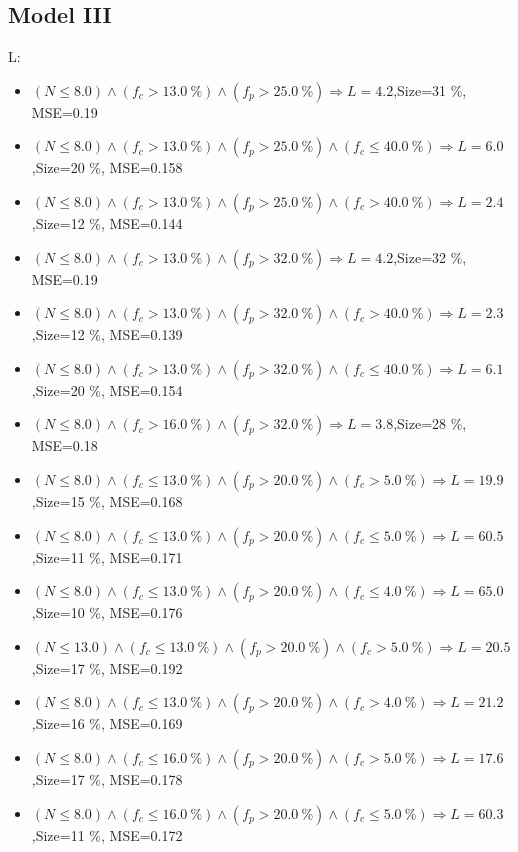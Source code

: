 \documentclass[numbered]{CSL}
\begin{document}
\subsection{Model III}
L:
\begin{itemize}
\item $(N \leq 8.0) \land (f_c > 13.0~\%) \land (f_p > 25.0~\%) \Rightarrow L = 4.2$,\hfill Size=31 \%, MSE=0.19
\item $(N \leq 8.0) \land (f_c > 13.0~\%) \land (f_p > 25.0~\%) \land (f_c \leq 40.0~\%) \Rightarrow L = 6.0$,\hfill Size=20 \%, MSE=0.158
\item $(N \leq 8.0) \land (f_c > 13.0~\%) \land (f_p > 25.0~\%) \land (f_c > 40.0~\%) \Rightarrow L = 2.4$,\hfill Size=12 \%, MSE=0.144
\item $(N \leq 8.0) \land (f_c > 13.0~\%) \land (f_p > 32.0~\%) \Rightarrow L = 4.2$,\hfill Size=32 \%, MSE=0.19
\item $(N \leq 8.0) \land (f_c > 13.0~\%) \land (f_p > 32.0~\%) \land (f_c > 40.0~\%) \Rightarrow L = 2.3$,\hfill Size=12 \%, MSE=0.139
\item $(N \leq 8.0) \land (f_c > 13.0~\%) \land (f_p > 32.0~\%) \land (f_c \leq 40.0~\%) \Rightarrow L = 6.1$,\hfill Size=20 \%, MSE=0.154
\item $(N \leq 8.0) \land (f_c > 16.0~\%) \land (f_p > 32.0~\%) \Rightarrow L = 3.8$,\hfill Size=28 \%, MSE=0.18
\item $(N \leq 8.0) \land (f_c \leq 13.0~\%) \land (f_p > 20.0~\%) \land (f_c > 5.0~\%) \Rightarrow L = 19.9$,\hfill Size=15 \%, MSE=0.168
\item $(N \leq 8.0) \land (f_c \leq 13.0~\%) \land (f_p > 20.0~\%) \land (f_c \leq 5.0~\%) \Rightarrow L = 60.5$,\hfill Size=11 \%, MSE=0.171
\item $(N \leq 8.0) \land (f_c \leq 13.0~\%) \land (f_p > 20.0~\%) \land (f_c \leq 4.0~\%) \Rightarrow L = 65.0$,\hfill Size=10 \%, MSE=0.176
\item $(N \leq 13.0) \land (f_c \leq 13.0~\%) \land (f_p > 20.0~\%) \land (f_c > 5.0~\%) \Rightarrow L = 20.5$,\hfill Size=17 \%, MSE=0.192
\item $(N \leq 8.0) \land (f_c \leq 13.0~\%) \land (f_p > 20.0~\%) \land (f_c > 4.0~\%) \Rightarrow L = 21.2$,\hfill Size=16 \%, MSE=0.169
\item $(N \leq 8.0) \land (f_c \leq 16.0~\%) \land (f_p > 20.0~\%) \land (f_c > 5.0~\%) \Rightarrow L = 17.6$,\hfill Size=17 \%, MSE=0.178
\item $(N \leq 8.0) \land (f_c \leq 16.0~\%) \land (f_p > 20.0~\%) \land (f_c \leq 5.0~\%) \Rightarrow L = 60.3$,\hfill Size=11 \%, MSE=0.172

\end{itemize}
\end{document}
